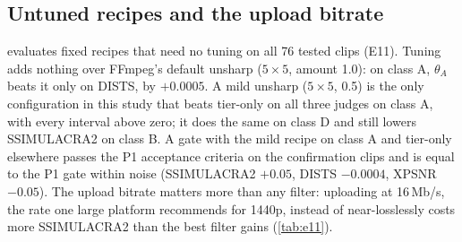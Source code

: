 \begin{table}[t]
  \centering
  \small
  \caption{E24: per-clip luma feedback minus a sharpening recipe on the 27 class-A clips (mean
  [95\,\% CI]). ``Feedback'' adds half of the luma error of a first upload to the source; ``mild +
  feedback'' also applies the mild unsharp to both uploads.}
  \label{tab:e24}
  \setlength{\tabcolsep}{3pt}
\end{table}

\subsection{Untuned recipes and the upload bitrate}
\label{sec:results-recipes}

 evaluates fixed recipes that need no tuning on all 76 tested clips (E11). Tuning adds
nothing over FFmpeg's default unsharp ($5\times5$, amount 1.0): on class A, $\theta_A$ beats it only on
DISTS, by $+0.0005$. A mild unsharp ($5\times5$, 0.5) is the only configuration in this study that
beats tier-only on all three judges on class A, with every interval above zero; it does the same on
class D and still lowers SSIMULACRA2 on class B. A gate with the mild recipe on class A and tier-only
elsewhere passes the P1 acceptance criteria on the confirmation clips and is equal to the P1 gate
within noise (SSIMULACRA2 $+0.05$, DISTS $-0.0004$, XPSNR $-0.05$). The upload bitrate matters more
than any filter: uploading at 16\,Mb/s, the rate one large platform recommends for 1440p, instead
of near-losslessly costs more SSIMULACRA2 than the best filter gains (\cref{tab:e11}).

